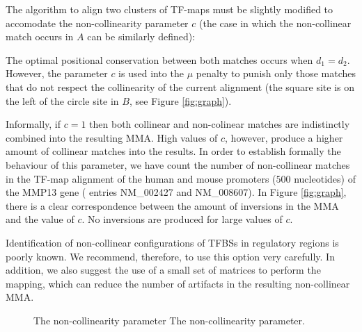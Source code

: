 The algorithm to align two clusters of TF-maps must be slightly modified 
to accomodate the non-collinearity parameter $c$ (the case in which the 
non-collinear match occurs in $A$ can be similarly defined):

\begin{center}
\end{center}

The optimal positional conservation between both matches occurs when $d_1 = d_2$.
However, the parameter $c$ is used into the $\mu$ penalty to punish only those
matches that do not respect the collinearity of the current alignment (the square
site is on the left of the circle site in $B$, see Figure \ref{fig:graph}). 

Informally, if $c=1$ then both collinear and non-colinear matches are indistinctly 
combined into the resulting MMA. High values of $c$, however, produce a higher amount 
of collinear matches into the results. In order to establish formally the behaviour of 
this parameter, we have count the number of non-collinear matches in the TF-map alignment
of the human and mouse promoters ($500$ nucleotides) of the MMP13 gene ( entries 
NM\_002427 and NM\_008607). In Figure \ref{fig:graph}, there is a clear correspondence between the 
amount of inversions in the MMA and the value of $c$. No inversions are produced for large 
values of $c$.

Identification of non-collinear configurations of TFBSs in regulatory regions
is poorly known. We recommend, therefore, to use this option very carefully. In
addition, we also suggest the use of a small set of matrices to perform the
mapping, which can reduce the number of artifacts in the resulting
non-collinear MMA.

\begin{figure}[t!]
\begin{center}
\setlength{\fboxsep}{0pt}
          {The non-collinearity parameter}%
          {The non-collinearity parameter.}%
          {}
\end{center}
\end{figure}

